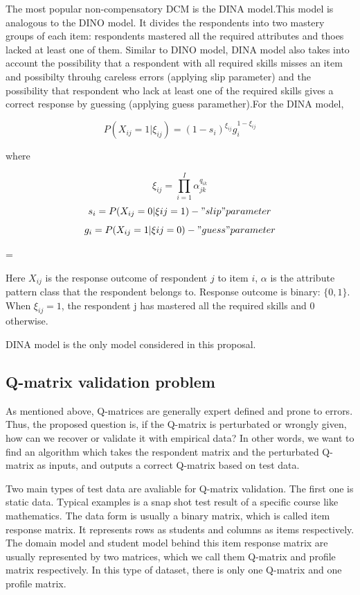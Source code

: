 \documentclass[11pt]{article}
\begin{document}
 The most popular non-compensatory DCM is the DINA model.This model is analogous to the DINO model. It divides the respondents into two mastery groups of each item: respondents mastered all the required attributes and thoes lacked at least one of them. Similar to DINO model, DINA model also takes into account the possibility that a respondent with all required skills misses an item and possibilty throuhg careless errors (applying slip parameter) and the possibility that respondent who lack at least one of the required skills gives a correct response by guessing (applying guess paramether).For the DINA model, 
 
  
$$P (X_{ij}=1|\xi_{ij})=(1-s_i)^{\xi_{ij}}g_i^{1-\xi_{ij}}$$  

where 

$$\xi_{ij}=\prod\limits_{i=1}^I \alpha_{jk}^{q_{ik}}$$
$$ s_i= P(X_{ij}=0|\xi{ij}=1)-"slip" parameter $$
$$ g_i= P(X_{ij}=1|\xi{ij}=0)-"guess" parameter $$




  
\parskip = \baselineskip


Here $X_{ij}$ is the response outcome of respondent $j$ to item $i$, $\alpha$ is the attribute pattern class that the respondent belongs to. Response outcome is binary: $\{0,1\}$. When $\xi_{ij}=1$, the respondent j has mastered all the required skills and 0 otherwise. 

DINA model is the only model considered in this proposal.  
  









  
\subsection{Q-matrix validation problem}
As mentioned above, Q-matrices are generally expert defined and prone to errors. Thus, the proposed question is, if the Q-matrix is perturbated or wrongly given, how can we recover or validate it with empirical data? In other words, we want to find an algorithm which takes the respondent matrix and the perturbated Q-matrix as inputs, and outputs a correct Q-matrix based on test data.

Two main types of test data are avaliable for Q-matrix validation. The first one is static data. Typical examples is a snap shot test result of a specific course like mathematics. The data form is usually a binary matrix, which is called item response matrix. It represents rows as students and columns as items respectively. The domain model and student model behind this item response matrix are usually represented by two matrices, which we call them Q-matrix and profile matrix respectively. In this type of dataset, there is only one Q-matrix and one profile matrix.
\end{document}
